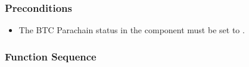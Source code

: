 \documentclass[a4paper,10pt,english]{sphinxmanual}
\begin{document}
\subsubsection{Preconditions}
\label{\detokenize{spec/issue:preconditions}}\begin{itemize}
\item {} 
The BTC Parachain status in the {\hyperref[\detokenize{spec/security:security}]{}} component must be set to .

\end{itemize}


\subsubsection{Function Sequence}
\end{document}
